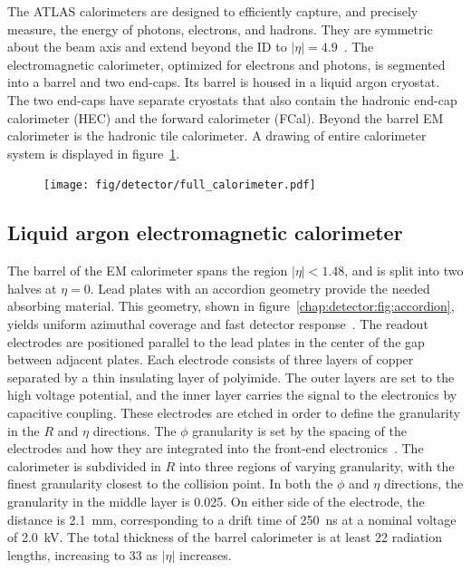
The ATLAS calorimeters are designed to efficiently capture, and
precisely measure, the energy of photons, electrons, and hadrons. They
are symmetric about the beam axis and extend beyond the ID to $|\eta|
= 4.9$~\cite{bib:Aad:2008zzm}. The electromagnetic calorimeter, optimized for electrons and
photons, is segmented into a barrel and two end-caps. Its barrel is
housed in a liquid argon cryostat. The two end-caps have separate
cryostats that also contain the hadronic end-cap calorimeter (HEC) and
the forward calorimeter (FCal). Beyond the barrel EM calorimeter is
the hadronic tile calorimeter. A drawing of entire calorimeter system is
displayed in figure~\ref{chap:detector:fig:calorimeter}.

\begin{figure}[ht]
    \centering
    \texttt{[image: fig/detector/full\_calorimeter.pdf]}
    \caption[]{}
\label{chap:detector:fig:calorimeter}
\end{figure}

\subsection{Liquid argon electromagnetic calorimeter}

The barrel of the EM calorimeter spans the region $|\eta|<1.48$, and
is split into two halves at $\eta = 0$. Lead plates with an accordion
geometry provide the needed absorbing material. This geometry, shown
in figure~\ref{chap:detector:fig:accordion}, yields uniform azimuthal coverage and fast detector
response~\cite{bib:Aad:2008zzm}. The readout electrodes are positioned parallel to
the lead plates in the center of the gap between adjacent plates. Each electrode
consists of three layers of copper separated by a thin insulating layer of
polyimide. The outer layers are set to the high voltage potential, and the
inner layer carries the signal to the electronics by
capacitive coupling. These electrodes are etched in order to define
the granularity in the $R$ and $\eta$ directions. The $\phi$
granularity is set by the spacing of the electrodes and how they are
integrated into the front-end electronics~\cite{bib:Aubert:2005dh}. The calorimeter is
subdivided in $R$ into three regions of varying granularity, with the
finest granularity closest to the collision point. In both the $\phi$
and $\eta$ directions, the granularity in the middle layer is 0.025. On either side of
the electrode, the distance is 2.1~mm, corresponding to a drift
time of 250~ns at a nominal voltage of 2.0~kV. The total thickness of
the barrel calorimeter is at least 22 radiation lengths, increasing to 33 as $|\eta|$
increases. 

